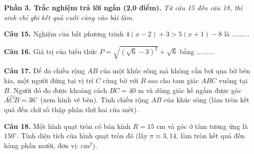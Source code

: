\documentclass[11pt,a4paper]{article}
\begin{document}
\vspace{3mm}
\noindent
\textbf{Phần 3. Trắc nghiệm trả lời ngắn (2,0 điểm).} \textit{Từ câu 15 đến câu 18, thí sinh chỉ ghi kết quả cuối cùng vào bài làm.}

\vspace{1.5mm}
\textbf{Câu 15.} Nghiệm của bất phương trình $4(x - 2) + 3 > 5(x + 1) - 8$ là $\dots\dots\dots$

\vspace{1.5mm}
\textbf{Câu 16.} Giá trị của biểu thức $P = \sqrt{(\sqrt{6} - 3)^2} + \sqrt{6}$ bằng $\dots\dots\dots$

\vspace{1.5mm}
\noindent
\begin{minipage}[c]{0.65\linewidth}
\textbf{Câu 17.} Để đo chiều rộng $AB$ của một khúc sông mà không cần bơi qua bờ bên kia, một người đứng tại vị trí $C$ cùng bờ với $B$ sao cho tam giác $ABC$ vuông tại $B$. Người đó đo được khoảng cách $BC = 40\text{ m}$ và dùng giác kế ngắm được góc $\widehat{ACB} = 36^\circ$ (xem hình vẽ bên). Tính chiều rộng $AB$ của khúc sông (làm tròn kết quả đến chữ số thập phân thứ hai của mét).
\end{minipage}\hfill
\begin{minipage}[c]{0.32\linewidth}
\centering
{}
\end{minipage}

\vspace{1.5mm}
\textbf{Câu 18.} Một hình quạt tròn có bán kính $R = 15\text{ cm}$ và góc ở tâm tương ứng là $150^\circ$. Tính diện tích của hình quạt tròn đó (lấy $\pi \approx 3{,}14$, làm tròn kết quả đến hàng phần mười, đơn vị: $\text{cm}^2$).
\end{document}
